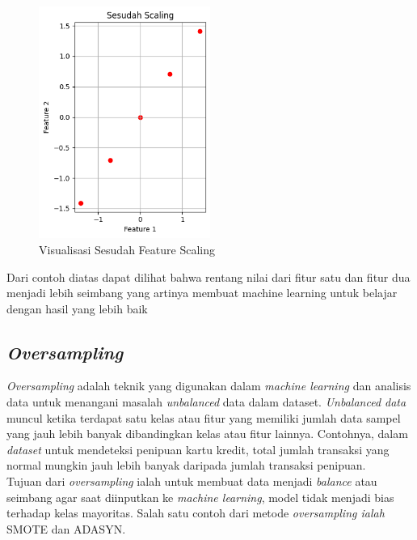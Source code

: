 \begin{figure}[H] %
    \centering
    \includegraphics[width=0.5\textwidth]{figure/after feature scaling.png}
    \caption{Visualisasi Sesudah Feature Scaling}
    \label{fig:2.visualisasisesudahfeaturescaling}
\end{figure}
Dari contoh diatas dapat dilihat bahwa rentang nilai dari fitur satu dan fitur dua menjadi lebih seimbang yang artinya membuat machine learning untuk belajar dengan hasil yang lebih baik

\subsection{\textit{Oversampling}} \label{II.oversampling}
\textit{Oversampling} adalah teknik yang digunakan dalam \textit{machine learning} dan analisis data untuk menangani masalah \textit{unbalanced} data dalam dataset\cite{liu2004effect}. \textit{Unbalanced data} muncul ketika terdapat satu kelas atau fitur yang memiliki jumlah data sampel yang jauh lebih banyak dibandingkan kelas atau fitur lainnya\cite{dal2015calibrating}. Contohnya, dalam \textit{dataset} untuk mendeteksi penipuan kartu kredit, total jumlah transaksi yang normal mungkin jauh lebih banyak daripada jumlah transaksi penipuan.\\
Tujuan dari \textit{oversampling} ialah untuk membuat data menjadi \textit{balance} atau seimbang agar saat diinputkan ke \textit{machine learning}, model tidak menjadi bias terhadap kelas mayoritas. Salah satu contoh dari metode \textit{oversampling ialah} SMOTE\cite{chawla2002smote} dan ADASYN\cite{4633969}.   

